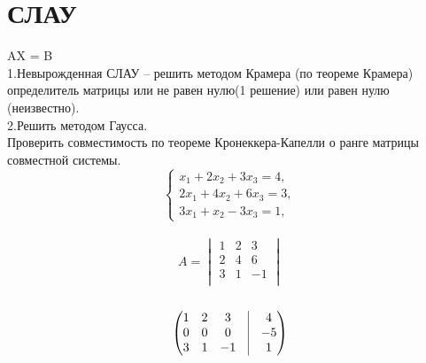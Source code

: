 \section{СЛАУ}
AX = B\\
1.Невырожденная СЛАУ – решить методом Крамера (по теореме Крамера)\\
определитель матрицы или не равен нулю(1 решение) или равен нулю (неизвестно).\\
2.Решить методом Гаусса.\\
Проверить совместимость по теореме Кронеккера-Капелли о ранге матрицы совместной системы.\\

\begin{equation*}
 \begin{cases}
   x_1 + 2x_2 + 3x_3 = 4, 
   \\
   2x_1 + 4x_2 + 6x_3 = 3, 
   \\
   3x_1 + x_2 - 3x_3 = 1, 
 \end{cases}
\end{equation*}
\\
\begin{equation*}
A = 
\begin{vmatrix}
  1 & 2 & 3\\
  2 & 4 & 6\\
  3 & 1 & -1\\
\end{vmatrix}
\end{equation*}\\

\begin{equation*}
\begin{pmatrix}
  1 & 2 & 3 & \vline &  4\\
  0 & 0 & 0 & \vline & -5\\
  3 & 1 & -1 & \vline &  1\\
\end{pmatrix}
\end{equation*}
